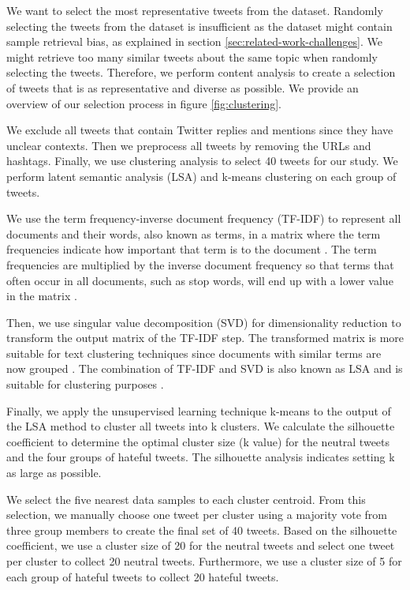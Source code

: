 %
We want to select the most representative tweets from the dataset.
%
Randomly selecting the tweets from the dataset is insufficient as the dataset might contain sample retrieval bias, as explained in section \ref{sec:related-work-challenges}.
%
We might retrieve too many similar tweets about the same topic when randomly selecting the tweets.
%
Therefore, we perform content analysis to create a selection of tweets that is as representative and diverse as possible.
%
We provide an overview of our selection process in figure \ref{fig:clustering}.
%

%
We exclude all tweets that contain Twitter replies and mentions since they have unclear contexts.
%
Then we preprocess all tweets by removing the URLs and hashtags.
%
Finally, we use clustering analysis to select 40 tweets for our study.
%
We perform latent semantic analysis (LSA) and k-means clustering on each group of tweets.
%

%
We use the term frequency-inverse document frequency (TF-IDF) to represent all documents and their words, also known as terms, in a matrix where the term frequencies indicate how important that term is to the document \citep{aggarwal2012survey}.
%
The term frequencies are multiplied by the inverse document frequency so that terms that often occur in all documents, such as stop words, will end up with a lower value in the matrix \citep{aggarwal2012survey}.
%

%
Then, we use singular value decomposition (SVD) for dimensionality reduction to transform the output matrix of the TF-IDF step.
%
The transformed matrix is more suitable for text clustering techniques since documents with similar terms are now grouped \citep{aggarwal2012survey}.
%
The combination of TF-IDF and SVD is also known as LSA and is suitable for clustering purposes \citep{aggarwal2012survey}.
%

%
Finally, we apply the unsupervised learning technique k-means to the output of the LSA method to cluster all tweets into k clusters.
%
We calculate the silhouette coefficient to determine the optimal cluster size (k value) for the neutral tweets and the four groups of hateful tweets.
%
The silhouette analysis indicates setting k as large as possible.
%

%
We select the five nearest data samples to each cluster centroid.
%
From this selection, we manually choose one tweet per cluster using a majority vote from three group members to create the final set of 40 tweets.
%
Based on the silhouette coefficient, we use a cluster size of 20 for the neutral tweets and select one tweet per cluster to collect 20 neutral tweets.
%
Furthermore, we use a cluster size of 5 for each group of hateful tweets to collect 20 hateful tweets.
%

